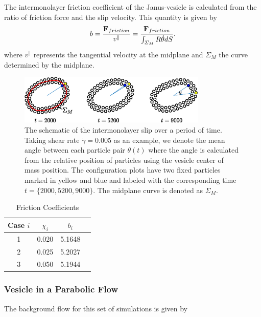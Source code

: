 \documentclass[lineno]{jfm}
\begin{document}
The intermonolayer friction coefficient of the Janus-vesicle is calculated from the ratio of friction force and the 
slip velocity. This quantity is given by 
\begin{equation}
b = \frac{{\bf F}_{friction}}{v^\parallel} = \frac{{\bf F}_{friction}}{\int_{\Sigma_M} R \dot\theta dS}.
\end{equation}
%
where $v^\parallel$ represents the tangential velocity at the midplane and $\Sigma_M$ the curve determined by the midplane.


\begin{figure}
\begin{center}
\includegraphics[width=0.8\textwidth]{Slip.eps}
\end{center} 
  \caption{The schematic of the intermonolayer slip over a period of time. Taking shear rate $\dot\gamma=0.005$ as an example, we denote the mean angle between each particle pair $\theta(t)$ where the angle is calculated from the relative position of particles using the vesicle center of mass position. The configuration plots have two fixed particles marked in yellow and blue and labeled with the corresponding time $t=\{2000,5200,9000\}$. The midplane curve is denoted as $\Sigma_M$.
  }
    \label{figure5}
\end{figure}


\begin{table}
\caption{Friction Coefficients}
\centering    
\begin{tabular}{c c c c}
\hline\hline                    
Case $i$ & $\chi_i$ & $b_i$\\
\hline 
1 & 0.020 &  5.1648  \\
2 & 0.025 &  5.2027  \\ 
3 & 0.050 &  5.1944   \\ [1ex]
\hline    
\end{tabular} 
\label{table1}
\end{table}


\subsubsection{Vesicle in a Parabolic Flow}

The background flow for this set of simulations is given by
\end{document}
